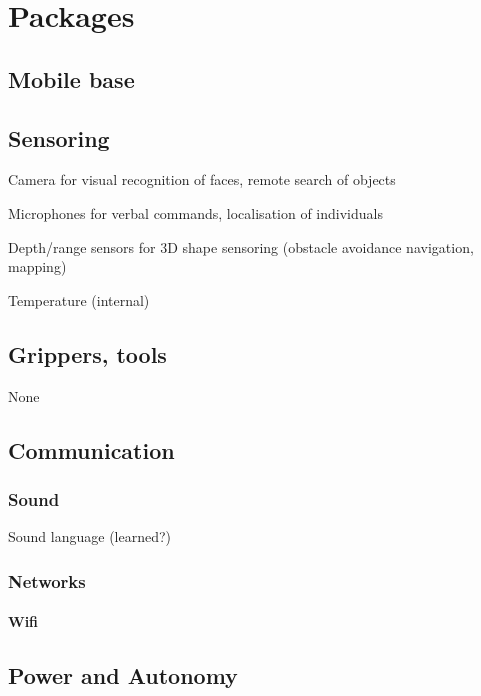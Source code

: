 \documentclass{report}
\begin{document}
\section{Packages}
\subsection{Mobile base}
\subsection{Sensoring}
Camera for visual recognition of faces, remote search of objects

Microphones for verbal commands, localisation of individuals

Depth/range sensors for 3D shape sensoring (obstacle avoidance navigation, mapping)

Temperature (internal)
\subsection{Grippers, tools}
None
\subsection{Communication}
\subsubsection{Sound}
Sound language (learned?) 
\subsubsection{Networks}

\paragraph{Wifi}

\subsection{Power and Autonomy}
\end{document}
